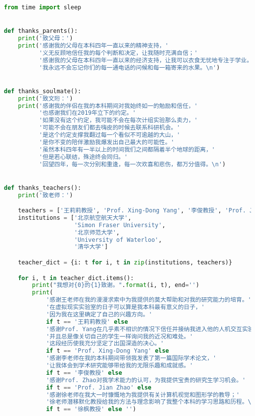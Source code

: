 \lstset{style=mystyle}
\begin{lstlisting}[language=Python, frame=none]
from time import sleep


def thanks_parents():
    print('致父母：')
    print('感谢我的父母在本科四年一直以来的精神支持，'
          '义无反顾地信任我的每个判断和决定，让我随时充满自信；'
          '感谢我的父母在本科四年一直以来的经济支持，让我可以衣食无忧地专注于学业。'
          '我永远不会忘记你们的每一通电话的问候和每一箱寄来的水果。\n')


def thanks_soulmate():
    print('致文珩：')
    print('感谢我的伴侣在我的本科期间对我始终如一的勉励和信任，'
          '也感谢我们在2019年立下的约定。'
          '如果没有这个约定，我可能不会在每次计组实验那么卖力，'
          '可能不会在朋友们都去嗨皮的时候去联系科研机会。'
          '是这个约定支撑我翻过每一个看似不可逾越的大山，'
          '是你不变的陪伴激励我爆发出自己最大的可能性。'
          '虽然本科四年有一半以上的时间我们之间都隔着半个地球的距离，'
          '但是若心联结，殊途终会同归。'
          '回望四年，每一次分别和重逢，每一次欢喜和悲伤，都万分值得。\n')


def thanks_teachers():
    print('致老师：')

    teachers = ['王莉莉教授', 'Prof. Xing-Dong Yang', '李俊教授', 'Prof. Jian Zhao', '徐枫教授']
    institutions = ['北京航空航天大学', 
                    'Simon Fraser University', 
                    '北京师范大学', 
                    'University of Waterloo', 
                    '清华大学']

    teacher_dict = {i: t for i, t in zip(institutions, teachers)}

    for i, t in teacher_dict.items():
        print("我想对{0}的{1}致谢。".format(i, t), end='')
        print(
            '感谢王老师在我的漫漫求索中为我提供的莫大帮助和对我的研究能力的培育。'
            '在虚拟现实实验室的日子可以算是我本科最有意义的日子，'
            '因为我在这里确定了自己的兴趣方向。' 
            if t == '王莉莉教授' else
            '感谢Prof. Yang在几乎素不相识的情况下信任并接纳我进入他的人机交互实验室，'
            '并且总是像关切自己的学生一样询问我的近况和难处。'
            '这段经历使我充分坚定了出国深造的决心。' 
            if t == 'Prof. Xing-Dong Yang' else
            '感谢李老师在我的本科期间带领我发表了第一篇国际学术论文，'
            '让我体会到学术研究能够带给我的无限乐趣和成就感。' 
            if t == '李俊教授' else
            '感谢Prof. Zhao对我学术能力的认可，为我提供宝贵的研究生学习机会。'
            if t == 'Prof. Jian Zhao' else
            '感谢徐老师在我大一时慷慨地为我提供有关计算机视觉和图形学的教导；'
            '徐老师潜移默化教授给我的方法与理念影响了我整个本科的学习思路和历程。\n' 
            if t == '徐枫教授' else '')



\end{lstlisting}
